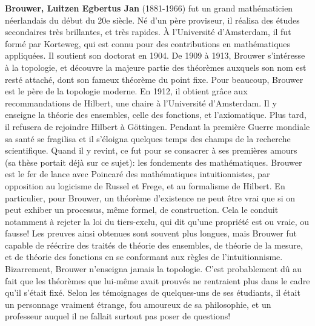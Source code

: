 \textbf{Brouwer, Luitzen Egbertus Jan} (1881-1966) fut un grand mathématicien néerlandais du début du 20e siècle. Né d'un père proviseur, il réalisa des études secondaires très brillantes, et très rapides. À l'Université d'Amsterdam, il fut formé par Korteweg, qui est connu pour des contributions en mathématiques appliquées. Il soutient son doctorat en 1904. De 1909 à 1913, Brouwer s'intéresse à la topologie, et découvre la majeure partie des théorèmes auxquels son nom est resté attaché, dont son fameux théorème du point fixe. Pour beaucoup, Brouwer est le père de la topologie moderne. En 1912, il obtient grâce aux recommandations de Hilbert, une chaire à l'Université d'Amsterdam. Il y enseigne la théorie des ensembles, celle des fonctions, et l'axiomatique. Plus tard, il refusera de rejoindre Hilbert à Göttingen. Pendant la première Guerre mondiale sa santé se fragilisa et il s'éloigna quelques temps des champs de la recherche scientifique. Quand il y revint, ce fut pour se consacrer à ses premières amours (sa thèse portait déjà sur ce sujet): les fondements des mathématiques.  Brouwer est le fer de lance avec Poincaré des mathématiques intuitionnistes, par opposition au logicisme de Russel et Frege, et au formalisme de Hilbert. En particulier, pour Brouwer, un théorème d'existence ne peut être vrai que si on peut exhiber un processus, même formel, de construction. Cela le conduit notamment à rejeter la loi du tiers-exclu, qui dit qu'une propriété est ou vraie, ou fausse! Les preuves ainsi obtenues sont souvent plus longues, mais Brouwer fut capable de réécrire des traités de théorie des ensembles, de théorie de la mesure, et de théorie des fonctions en se conformant aux règles de l'intuitionnisme. Bizarrement, Brouwer n'enseigna jamais la topologie. C'est probablement dû au fait que les théorèmes que lui-même avait prouvés ne rentraient plus dans le cadre qu'il s'était fixé. Selon les témoignages de quelques-uns de ses étudiants, il était un personnage vraiment étrange, fou amoureux de sa philosophie, et un professeur auquel il ne fallait surtout pas poser de questions!

{}
\label{sec:C}

